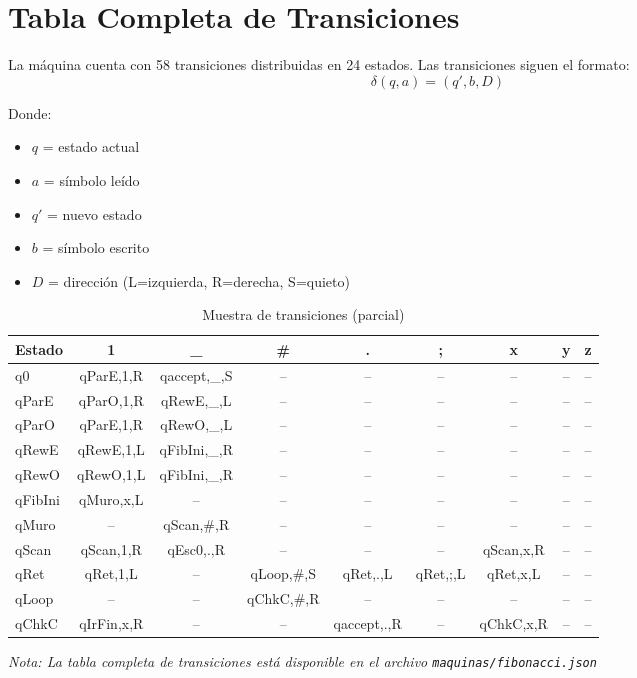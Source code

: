 \documentclass[12pt,a4paper]{article}
\begin{document}
\newpage

\appendix
\section{Tabla Completa de Transiciones}

La máquina cuenta con 58 transiciones distribuidas en 24 estados. Las transiciones siguen el formato:
$$\delta(q, a) = (q', b, D)$$

Donde:
\begin{itemize}
    \item $q$ = estado actual
    \item $a$ = símbolo leído
    \item $q'$ = nuevo estado
    \item $b$ = símbolo escrito
    \item $D$ = dirección (L=izquierda, R=derecha, S=quieto)
\end{itemize}

\begin{table}[H]
\centering
\small
\begin{tabular}{l|cccccccc}
\toprule
\textbf{Estado} & \textbf{1} & \textbf{\_} & \textbf{\#} & \textbf{.} & \textbf{;} & \textbf{x} & \textbf{y} & \textbf{z} \\
\midrule
q0 & qParE,1,R & qaccept,\_,S & -- & -- & -- & -- & -- & -- \\
qParE & qParO,1,R & qRewE,\_,L & -- & -- & -- & -- & -- & -- \\
qParO & qParE,1,R & qRewO,\_,L & -- & -- & -- & -- & -- & -- \\
qRewE & qRewE,1,L & qFibIni,\_,R & -- & -- & -- & -- & -- & -- \\
qRewO & qRewO,1,L & qFibIni,\_,R & -- & -- & -- & -- & -- & -- \\
qFibIni & qMuro,x,L & -- & -- & -- & -- & -- & -- & -- \\
qMuro & -- & qScan,\#,R & -- & -- & -- & -- & -- & -- \\
qScan & qScan,1,R & qEsc0,.,R & -- & -- & -- & qScan,x,R & -- & -- \\
qRet & qRet,1,L & -- & qLoop,\#,S & qRet,.,L & qRet,;,L & qRet,x,L & -- & -- \\
qLoop & -- & -- & qChkC,\#,R & -- & -- & -- & -- & -- \\
qChkC & qIrFin,x,R & -- & -- & qaccept,.,R & -- & qChkC,x,R & -- & -- \\
\bottomrule
\end{tabular}
\caption{Muestra de transiciones (parcial)}
\end{table}

\textit{Nota: La tabla completa de transiciones está disponible en el archivo \texttt{maquinas/fibonacci.json}}
\end{document}
